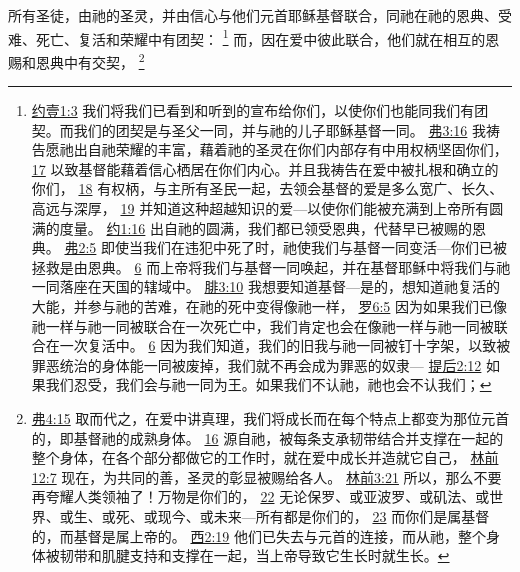 \documentclass[12pt, a4paper, oneside]{ctexart}
\newcounter{parnum}[section]
\newcommand{\N}{%
   \noindent\refstepcounter{parnum}%
    \makebox[\parindent][l]{\textbf{\arabic{parnum}.}}}
\begin{document}
\N 所有圣徒，由祂的圣灵，并由信心与他们元首耶稣基督联合，同祂在祂的恩典、受难、死亡、复活和荣耀中有团契：
	\footnote {
		\href{https://biblehub.com/1_john/1-3.htm}{约壹1:3} 我们将我们已看到和听到的宣布给你们，以使你们也能同我们有团契。而我们的团契是与圣父一同，并与祂的儿子耶稣基督一同。
		\href{https://biblehub.com/ephesians/3-16.htm}{弗3:16} 我祷告愿祂出自祂荣耀的丰富，藉着祂的圣灵在你们内部存有中用权柄坚固你们，
		\href{https://biblehub.com/ephesians/3-17.htm}{17} 以致基督能藉着信心栖居在你们内心。并且我祷告在爱中被扎根和确立的你们，
		\href{https://biblehub.com/ephesians/3-18.htm}{18} 有权柄，与主所有圣民一起，去领会基督的爱是多么宽广、长久、高远与深厚，
		\href{https://biblehub.com/ephesians/3-19.htm}{19} 并知道这种超越知识的爱---以使你们能被充满到上帝所有圆满的度量。
		\href{https://biblehub.com/john/1-16.htm}{约1:16} 出自祂的圆满，我们都已领受恩典，代替早已被赐的恩典。
		\href{https://biblehub.com/ephesians/2-5.htm}{弗2:5} 即使当我们在违犯中死了时，祂使我们与基督一同变活---你们已被拯救是由恩典。
		\href{https://biblehub.com/ephesians/2-6.htm}{6} 而上帝将我们与基督一同唤起，并在基督耶稣中将我们与祂一同落座在天国的辖域中。
		\href{https://biblehub.com/philippians/3-10.htm}{腓3:10} 我想要知道基督---是的，想知道祂复活的大能，并参与祂的苦难，在祂的死中变得像祂一样，
		\href{https://biblehub.com/romans/6-5.htm}{罗6:5} 因为如果我们已像祂一样与祂一同被联合在一次死亡中，我们肯定也会在像祂一样与祂一同被联合在一次复活中。
		\href{https://biblehub.com/romans/6-6.htm}{6} 因为我们知道，我们的旧我与祂一同被钉十字架，以致被罪恶统治的身体能一同被废掉，我们就不再会成为罪恶的奴隶---
		\href{https://biblehub.com/2_timothy/2-12.htm}{提后2:12} 如果我们忍受，我们会与祂一同为王。如果我们不认祂，祂也会不认我们；
	}
	而，因在爱中彼此联合，他们就在相互的恩赐和恩典中有交契，
	\footnote {
		\href{https://biblehub.com/ephesians/4-15.htm}{弗4:15} 取而代之，在爱中讲真理，我们将成长而在每个特点上都变为那位元首的，即基督祂的成熟身体。
		\href{https://biblehub.com/ephesians/4-16.htm}{16} 源自祂，被每条支承韧带结合并支撑在一起的整个身体，在各个部分都做它的工作时，就在爱中成长并造就它自己，
		\href{https://biblehub.com/1_corinthians/12-7.htm}{林前12:7} 现在，为共同的善，圣灵的彰显被赐给各人。
		\href{https://biblehub.com/1_corinthians/3-21.htm}{林前3:21} 所以，那么不要再夸耀人类领袖了！万物是你们的，
		\href{https://biblehub.com/1_corinthians/3-22.htm}{22} 无论保罗、或亚波罗、或矶法、或世界、或生、或死、或现今、或未来---所有都是你们的，
		\href{https://biblehub.com/1_corinthians/3-23.htm}{23} 而你们是属基督的，而基督是属上帝的。
		\href{https://biblehub.com/colossians/2-19.htm}{西2:19} 他们已失去与元首的连接，而从祂，整个身体被韧带和肌腱支持和支撑在一起，当上帝导致它生长时就生长。
	}
\end{document}
